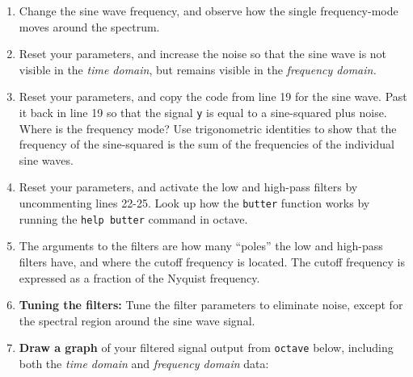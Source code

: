 \documentclass[10.5pt]{article}
\begin{document}
\begin{enumerate}
\item Change the sine wave frequency, and observe how the single frequency-mode moves around the spectrum.
\item Reset your parameters, and increase the noise so that the sine wave is not visible in the \textit{time domain}, but remains visible in the \textit{frequency domain.}
\item Reset your parameters, and copy the code from line 19 for the sine wave.  Past it back in line 19 so that the signal \verb+y+ is equal to a sine-squared plus noise.  Where is the frequency mode?  Use trigonometric identities to show that the frequency of the sine-squared is the sum of the frequencies of the individual sine waves.
\item Reset your parameters, and activate the low and high-pass filters by uncommenting lines 22-25.  Look up how the \verb+butter+ function works by running the \verb+help butter+ command in octave.
\item The arguments to the filters are how many ``poles'' the low and high-pass filters have, and where the cutoff frequency is located.  The cutoff frequency is expressed as a fraction of the Nyquist frequency.
\item \textbf{Tuning the filters:} Tune the filter parameters to eliminate noise, except for the spectral region around the sine wave signal.
\item \textbf{Draw a graph} of your filtered signal output from \verb+octave+ below, including both the \textit{time domain} and \textit{frequency domain} data:
\end{enumerate}
\end{document}
